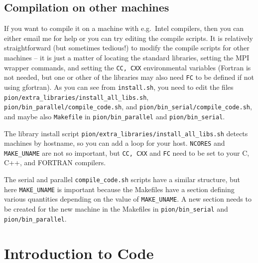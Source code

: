\documentclass[a4paper,11pt]{report}
\begin{document}
\subsection{Compilation on other machines}
If you want to compile it on a machine with e.g.\ Intel compilers, then you can either email me for help or you can try editing the compile scripts.
It is relatively straightforward (but sometimes tedious!) to modify the compile scripts for other machines -- it is just a matter of locating the standard libraries, setting the MPI wrapper commands, and setting the \texttt{CC, CXX} environmental variables (Fortran is not needed, but one or other of the libraries may also need \texttt{FC} to be defined if not using gfortran).
As you can see from \verb|install.sh|, you need to edit the files
\verb|pion/extra_libraries/install_all_libs.sh|,
\verb|pion/bin_parallel/compile_code.sh|, and
\verb|pion/bin_serial/compile_code.sh|, and maybe also \verb|Makefile| in
\verb|pion/bin_parallel| and \verb|pion/bin_serial|.

The library install script \verb|pion/extra_libraries/install_all_libs.sh| detects machines by hostname, so you can add a loop for your host.
\texttt{NCORES} and \texttt{MAKE\_UNAME} are not so important, but \texttt{CC, CXX} and \texttt{FC} need to be set to your C, C++, and FORTRAN compilers.

The serial and parallel \verb|compile_code.sh| scripts have a similar structure, but here \texttt{MAKE\_UNAME} is important because the Makefiles have a section defining various quantities depending on the value of \texttt{MAKE\_UNAME}.
A new section needs to be created for the new machine in the Makefiles in \verb|pion/bin_serial| and \verb|pion/bin_parallel|.



\section{Introduction to Code}
%
\end{document}

